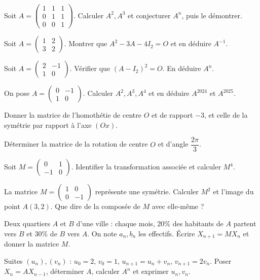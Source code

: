 \exo{} Soit $A=\begin{pmatrix}1&1&1\\0&1&1\\0&0&1\end{pmatrix}$. Calculer $A^2,A^3$ et
conjecturer $A^n$, puis le démontrer.

\exo{} Soit $A=\begin{pmatrix}1&2\\3&2\end{pmatrix}$. Montrer que $A^2-3A-4I_2=O$ et en
déduire $A^{-1}$.

\exo{} Soit $A=\begin{pmatrix}2&-1\\1&0\end{pmatrix}$. Vérifier que $(A-I_2)^2=O$. En
déduire $A^n$.

\exo{} On pose $A=\begin{pmatrix}0&-1\\1&0\end{pmatrix}$. Calculer $A^2,A^3,A^4$ et en
déduire $A^{2024}$ et $A^{2025}$.

\exo{} Donner la matrice de l'homothétie de centre $O$ et de rapport $-3$, et celle de la
symétrie par rapport à l'axe $(Ox)$.

\exo{} Déterminer la matrice de la rotation de centre $O$ et d'angle $\dfrac{2\pi}{3}$.

\exo{} Soit $M=\begin{pmatrix}0&1\\-1&0\end{pmatrix}$. Identifier la transformation associée
et calculer $M^4$.

\exo{} La matrice $M=\begin{pmatrix}1&0\\0&-1\end{pmatrix}$ représente une symétrie. Calculer
$M^2$ et l'image du point $A(3,2)$. Que dire de la composée de $M$ avec elle-même ?

\exo{} Deux quartiers $A$ et $B$ d'une ville : chaque mois, $20\%$ des habitants de $A$
partent vers $B$ et $30\%$ de $B$ vers $A$. On note $a_n,b_n$ les effectifs. Écrire $X_{n+1}=MX_n$
et donner la matrice $M$.

\exo{} Suites $(u_n),(v_n)$ : $u_0=2,\,v_0=1$, $u_{n+1}=u_n+v_n$, $v_{n+1}=2v_n$. Poser
$X_n=AX_{n-1}$, déterminer $A$, calculer $A^n$ et exprimer $u_n,v_n$.

